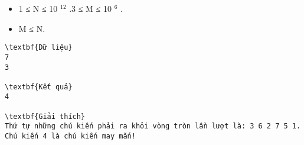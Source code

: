 \begin{itemize}
	\item     1 ≤ N ≤ 10    $^     12    $    .3 ≤ M ≤ 10    $^     6    $    .   
	\item     M ≤ N.   
\end{itemize}
\begin{verbatim}
\textbf{Dữ liệu}
7 
3

\textbf{Kết quả}
4

\textbf{Giải thích}
Thứ tự những chú kiến phải ra khỏi vòng tròn lần lượt là: 3 6 2 7 5 1.
Chú kiến 4 là chú kiến may mắn!
\end{verbatim}